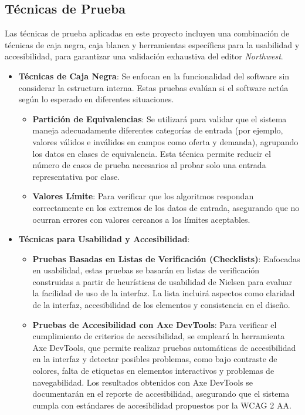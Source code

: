 \documentclass[stu, 12pt, letterpaper, donotrepeattitle, floatsintext, natbib]{apa7}
\begin{document}
\subsection{Técnicas de Prueba}

\noindent Las técnicas de prueba aplicadas en este proyecto incluyen una combinación de técnicas de caja negra, caja blanca y herramientas específicas para la usabilidad y accesibilidad, para garantizar una validación exhaustiva del editor \textit{Northwest}.

\begin{itemize}
    \item \textbf{Técnicas de Caja Negra}: Se enfocan en la funcionalidad del software sin considerar la estructura interna. Estas pruebas evalúan si el software actúa según lo esperado en diferentes situaciones.
    
    \begin{itemize}
        \item \textbf{Partición de Equivalencias}: Se utilizará para validar que el sistema maneja adecuadamente diferentes categorías de entrada (por ejemplo, valores válidos e inválidos en campos como oferta y demanda), agrupando los datos en clases de equivalencia. Esta técnica permite reducir el número de casos de prueba necesarios al probar solo una entrada representativa por clase.
        \item \textbf{Valores Límite}: Para verificar que los algoritmos respondan correctamente en los extremos de los datos de entrada, asegurando que no ocurran errores con valores cercanos a los límites aceptables.
    \end{itemize}

    \item \textbf{Técnicas para Usabilidad y Accesibilidad}:
    \begin{itemize}
        \item \textbf{Pruebas Basadas en Listas de Verificación (Checklists)}: Enfocadas en usabilidad, estas pruebas se basarán en listas de verificación construidas a partir de heurísticas de usabilidad de Nielsen para evaluar la facilidad de uso de la interfaz. La lista incluirá aspectos como claridad de la interfaz, accesibilidad de los elementos y consistencia en el diseño.
        \item \textbf{Pruebas de Accesibilidad con Axe DevTools}: Para verificar el cumplimiento de criterios de accesibilidad, se empleará la herramienta Axe DevTools, que permite realizar pruebas automáticas de accesibilidad en la interfaz y detectar posibles problemas, como bajo contraste de colores, falta de etiquetas en elementos interactivos y problemas de navegabilidad. Los resultados obtenidos con Axe DevTools se documentarán en el reporte de accesibilidad, asegurando que el sistema cumpla con estándares de accesibilidad propuestos por la WCAG 2 AA.
    \end{itemize}
\end{itemize}
\end{document}
